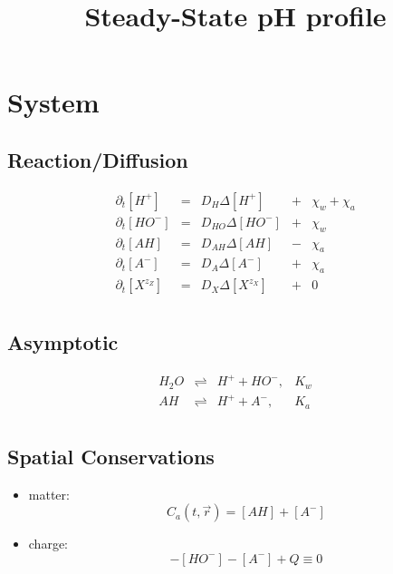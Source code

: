 \documentclass[aps,12pt]{revtex4}
\begin{document}
\title{Steady-State pH profile}
\maketitle

\section{System}

\subsection{Reaction/Diffusion}
\begin{equation}
\begin{array}{rclcl}
	\partial_t [H^+]  & = & D_H \Delta [H^+]     &+&\chi_w+\chi_a\\
	\partial_t [HO^-] & = & D_{HO} \Delta [HO^-] &+&\chi_w\\
	\partial_t [AH]   & = & D_{AH} \Delta [AH]   &-&\chi_a\\
	\partial_t [A^-]  & = & D_{A} \Delta [A^-] &+& \chi_a\\
	\partial_t [X^{z_Z}] & = & D_X \Delta [X^{z_X}] &+& 0\\
\end{array}
\end{equation}

\subsection{Asymptotic}
\begin{equation}
	\begin{array}{rcll}
	H_2O  & \rightleftharpoons & H^+ + HO^-, & K_w\\
	AH    & \rightleftharpoons & H^+ + A^-,  & K_a\\
	\end{array}
\end{equation}

\subsection{Spatial Conservations}

\begin{itemize}
\item matter:
\begin{equation}
	C_a(t,\vec r) = [AH] + [A^-]
\end{equation}

\item charge:
\begin{equation}
	[H^+]-[HO^-]-[A^-]+Q\equiv0
\end{equation}

\end{itemize}
\end{document}

